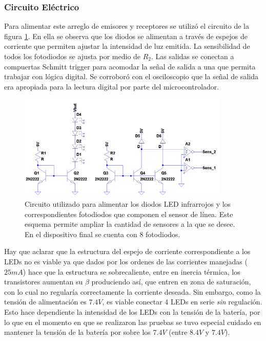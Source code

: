 \documentclass[10pt,conference,a4paper,onecolumn]{article}%
\begin{document}
\subsubsection{Circuito Eléctrico}
Para alimentar este arreglo de emisores y receptores se utilizó el circuito de la figura \ref{fig:circuitoSensorLinea}. En ella se observa que los diodos se alimentan a través de espejos de corriente que permiten ajustar la intensidad de luz emitida. La sensibilidad de todos los fotodiodos se ajusta por medio de $R_2$. Las salidas se conectan a compuertas Schmitt trigger para acomodar la señal de salida a una que permita trabajar con lógica digital. Se corroboró con el osciloscopio que la señal de salida era apropiada para la lectura digital por parte del microcontrolador.
\begin{figure}[h]
	\centering
	\includegraphics[width=10cm]{./imagenes/circ_sens_lin.png}%
	\caption{Circuito utilizado para alimentar los diodos LED infrarrojos y los correspondientes fotodiodos que componen el sensor de línea. Este esquema permite ampliar la cantidad de sensores a la que se desee. En el dispositivo final se cuenta con 8 fotodiodos. }
	\label{fig:circuitoSensorLinea}
\end{figure}
Hay que aclarar que la estructura del espejo de corriente correspondiente a los LEDs no es viable ya que dados por los ordenes de las corrientes manejadas ($25mA$) hace que la estructura se sobrecaliente, entre en inercia térmica, los transistores aumentan su $\beta$ produciendo así, que entren en zona de saturación, con lo cual no regularía correctamente la corriente deseada. Sin embargo, como la tensión de alimentación es $7.4V$, es viable conectar 4 LEDs en serie \textit{sin} regulación. Esto hace dependiente la intensidad de los LEDs con la tensión de la batería, por lo que en el momento en que se realizaron las pruebas se tuvo especial cuidado en mantener la tensión de la batería por sobre los $7.4V$ (entre $8.4V$ y $7.4V$).
\end{document}
